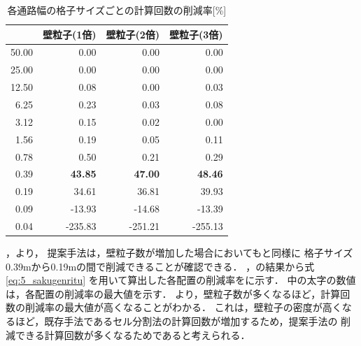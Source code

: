 \begin{table}[tb]
  \centering
  \caption{各通路幅の格子サイズごとの計算回数の削減率[\%]}
  \label{tb:5_bai_sakugenritu}
    \begin{tabular}{r|r|r|r}
    \hline \hline
		      & 壁粒子(1倍)    & 壁粒子(2倍)      & 壁粒子(3倍)        \\ \hline
		50.00 & 0.00           & 0.00             & 0.00               \\ \hline
		25.00 & 0.00           & 0.00             & 0.00               \\ \hline
		12.50 & 0.08           & 0.00             & 0.03               \\ \hline
		 6.25 & 0.23           & 0.03             & 0.08               \\ \hline
		 3.12 & 0.15           & 0.02             & 0.00               \\ \hline
		 1.56 & 0.19           & 0.05             & 0.11               \\ \hline
		 0.78 & 0.50           & 0.21             & 0.29               \\ \hline
		 0.39 & \textbf{43.85} & \textbf{47.00}   & \textbf{48.46}     \\ \hline
		 0.19 & 34.61          & 36.81            & 39.93              \\ \hline
		 0.09 & -13.93         & -14.68           & -13.39             \\ \hline
		 0.04 & -235.83        & -251.21          & -255.13            \\ \hline
    \end{tabular}
\end{table}

，より，
提案手法は，壁粒子数が増加した場合においてもと同様に
格子サイズ0.39mから0.19mの間で削減できることが確認できる．
，の結果から式\eqref{eq:5_sakugenritu}
を用いて算出した各配置の削減率をに示す．
中の太字の数値は，各配置の削減率の最大値を示す．
より，壁粒子数が多くなるほど，計算回数の削減率の最大値が高くなることがわかる．
これは，壁粒子の密度が高くなるほど，既存手法であるセル分割法の計算回数が増加するため，提案手法の
削減できる計算回数が多くなるためであると考えられる．


\clearpage

